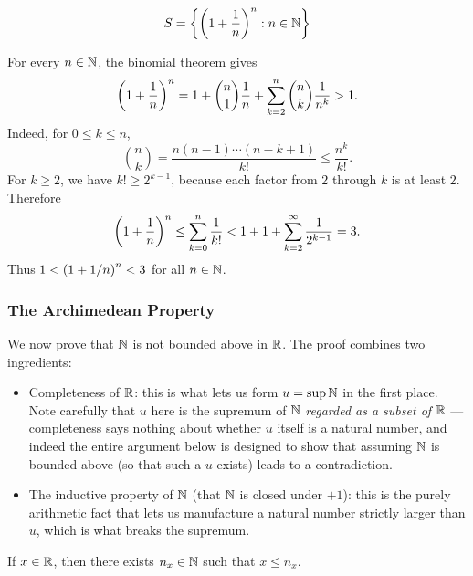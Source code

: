 \begin{example}
    \begin{equation*}
        S = \left\{\left(1 + \frac{1}{n }\right)^n : n \in \mathbb{N}\right\}
    \end{equation*}
    
    For every $n\in\mathbb{N}$, the binomial theorem gives
    \begin{equation*}
        \left(1+\frac1n\right)^n
        =1+\binom n1\frac1n+\sum_{k=2}^n\binom nk\frac1{n^k}>1.
    \end{equation*}
    Indeed, for $0\leq k\leq n$,
    \begin{equation*}
        \binom nk=\frac{n(n-1)\cdots(n-k+1)}{k!}\leq\frac{n^k}{k!}.
    \end{equation*}
    For $k\geq2$, we have
    $k!\geq2^{k-1}$, because each factor from $2$ through $k$ is at least $2$. Therefore
    \begin{equation*}
        \left(1+\frac1n\right)^n
        \leq\sum_{k=0}^n\frac1{k!}
        < 1+1+\sum_{k=2}^{\infty}\frac1{2^{k-1}}=3.
    \end{equation*}
    Thus $1<\left(1+1/n\right)^n<3$ for all $n\in\mathbb{N}$.
\end{example}

\subsubsection{The Archimedean Property}
We now prove that $\mathbb{N}$ is not bounded above in $\mathbb{R}$. The proof combines two ingredients:
\begin{itemize}
    \item Completeness of $\mathbb{R}$: this is what lets us form $u = \sup \mathbb{N}$ in the first place. Note carefully that $u$ here is the supremum of $\mathbb{N}$ \emph{regarded as a subset of $\mathbb{R}$} — completeness says nothing about whether $u$ itself is a natural number, and indeed the entire argument below is designed to show that assuming $\mathbb{N}$ is bounded above (so that such a $u$ exists) leads to a contradiction.
    \item The inductive property of $\mathbb{N}$ (that $\mathbb{N}$ is closed under $+1$): this is the purely arithmetic fact that lets us manufacture a natural number strictly larger than $u$, which is what breaks the supremum.
\end{itemize}

\begin{definition}
    \label{def:archimedean}
    If $x \in \mathbb{R}$, then there exists $n_x \in \mathbb{N}$ such that $x \leq n_x$. 
\end{definition}

